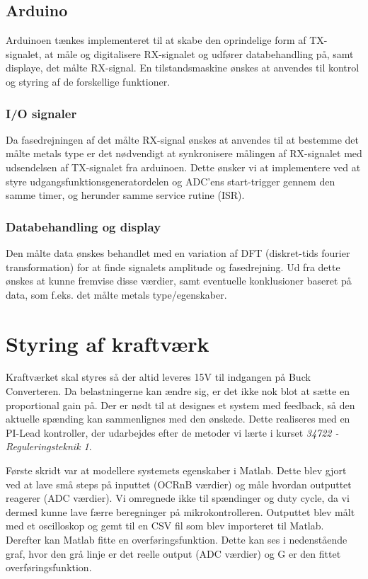 \documentclass[../main.tex]{subfiles}
\begin{document}
\subsection{Arduino}
Arduinoen tænkes implementeret til at skabe den oprindelige form af TX-signalet, at måle og digitalisere RX-signalet og udfører databehandling på, samt displaye, det målte RX-signal.
En tilstandsmaskine ønskes at anvendes til kontrol og styring af de forskellige funktioner.

\subsubsection{I/O signaler}
Da fasedrejningen af det målte RX-signal ønskes at anvendes til at bestemme det målte metals type er det nødvendigt at synkronisere målingen af RX-signalet med udsendelsen af TX-signalet fra arduinoen. Dette ønsker vi at implementere ved at styre udgangsfunktionsgeneratordelen og ADC'ens start-trigger gennem den samme timer, og herunder samme service rutine (ISR).

\subsubsection{Databehandling og display}
Den målte data ønskes behandlet med en variation af DFT (diskret-tids fourier transformation) for at finde signalets amplitude og fasedrejning. Ud fra dette ønskes at kunne fremvise disse værdier, samt eventuelle konklusioner baseret på data, som f.eks. det målte metals type/egenskaber.

\section{Styring af kraftværk}
Kraftværket skal styres så der altid leveres 15V til indgangen på Buck Converteren. Da belastningerne kan ændre sig, er det ikke nok blot at sætte en proportional gain på. Der er nødt til at designes et system med feedback, så den aktuelle spænding kan sammenlignes med den ønskede. Dette realiseres med en PI-Lead kontroller, der udarbejdes efter de metoder vi lærte i kurset \emph{34722 - Reguleringsteknik 1}.

Første skridt var at modellere systemets egenskaber i Matlab. Dette blev gjort ved at lave små steps på inputtet (OCRnB værdier) og måle hvordan outputtet reagerer (ADC værdier). Vi omregnede ikke til spændinger og duty cycle, da vi dermed kunne lave færre beregninger på mikrokontrolleren. Outputtet blev målt med et oscilloskop og gemt til en CSV fil som blev importeret til Matlab. Derefter kan Matlab fitte en overføringsfunktion. Dette kan ses i nedenstående graf, hvor den grå linje er det reelle output (ADC værdier) og G er den fittet overføringsfunktion. 
\end{document}
